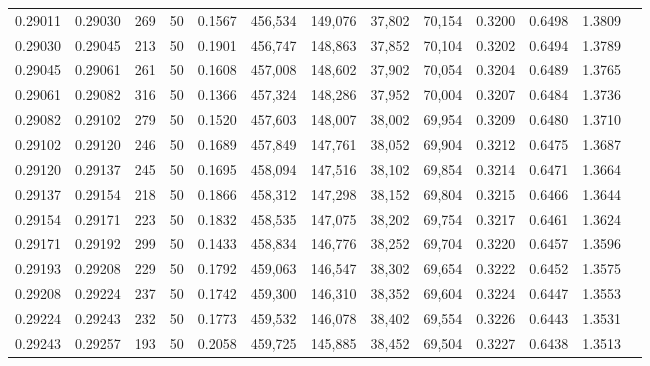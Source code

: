\begin{tabular}{rrrrrrrrrrrrr}
0.29011 & 0.29030 &   269 &  50 &                                     0.1567 & 456,534 & 149,076 &  37,802 &  70,154 & 0.3200 & 0.6498 & 1.3809 \\
0.29030 & 0.29045 &   213 &  50 &                                     0.1901 & 456,747 & 148,863 &  37,852 &  70,104 & 0.3202 & 0.6494 & 1.3789 \\
0.29045 & 0.29061 &   261 &  50 &                                     0.1608 & 457,008 & 148,602 &  37,902 &  70,054 & 0.3204 & 0.6489 & 1.3765 \\
0.29061 & 0.29082 &   316 &  50 &                                     0.1366 & 457,324 & 148,286 &  37,952 &  70,004 & 0.3207 & 0.6484 & 1.3736 \\
0.29082 & 0.29102 &   279 &  50 &                                     0.1520 & 457,603 & 148,007 &  38,002 &  69,954 & 0.3209 & 0.6480 & 1.3710 \\
0.29102 & 0.29120 &   246 &  50 &                                     0.1689 & 457,849 & 147,761 &  38,052 &  69,904 & 0.3212 & 0.6475 & 1.3687 \\
0.29120 & 0.29137 &   245 &  50 &                                     0.1695 & 458,094 & 147,516 &  38,102 &  69,854 & 0.3214 & 0.6471 & 1.3664 \\
0.29137 & 0.29154 &   218 &  50 &                                     0.1866 & 458,312 & 147,298 &  38,152 &  69,804 & 0.3215 & 0.6466 & 1.3644 \\
0.29154 & 0.29171 &   223 &  50 &                                     0.1832 & 458,535 & 147,075 &  38,202 &  69,754 & 0.3217 & 0.6461 & 1.3624 \\
0.29171 & 0.29192 &   299 &  50 &                                     0.1433 & 458,834 & 146,776 &  38,252 &  69,704 & 0.3220 & 0.6457 & 1.3596 \\
0.29193 & 0.29208 &   229 &  50 &                                     0.1792 & 459,063 & 146,547 &  38,302 &  69,654 & 0.3222 & 0.6452 & 1.3575 \\
0.29208 & 0.29224 &   237 &  50 &                                     0.1742 & 459,300 & 146,310 &  38,352 &  69,604 & 0.3224 & 0.6447 & 1.3553 \\
0.29224 & 0.29243 &   232 &  50 &                                     0.1773 & 459,532 & 146,078 &  38,402 &  69,554 & 0.3226 & 0.6443 & 1.3531 \\
0.29243 & 0.29257 &   193 &  50 &                                     0.2058 & 459,725 & 145,885 &  38,452 &  69,504 & 0.3227 & 0.6438 & 1.3513 \\

\end{tabular}

